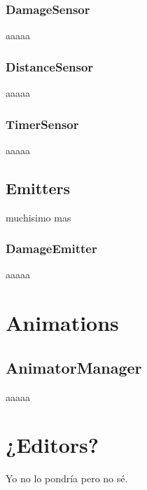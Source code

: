 \subsubsection{DamageSensor}
aaaaa
\subsubsection{DistanceSensor}
aaaaa
\subsubsection{TimerSensor}
aaaaa

\subsection{Emitters}
muchisimo mas
\subsubsection{DamageEmitter}
aaaaa

\section{Animations}
\subsection{AnimatorManager}
aaaaa

\section{¿Editors?}
Yo no lo pondría pero no sé.


